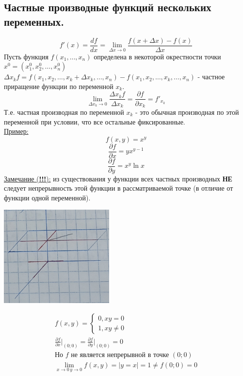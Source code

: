 \documentclass[12pt]{article}
\begin{document}
    \subsection{Частные производные функций нескольких переменных.}
    \[ f'(x) = \frac{df}{dx} = \lim_{\Delta x \to 0}\frac{f(x+\Delta x) - f(x)}{\Delta x} \]
    Пусть функция $f(x_1, \dots, x_n)$ определена в некоторой окрестности точки $x^0 = (x^0_1, x^0_2, \dots, x^0_n)$\\
    $\Delta x_k f = f(x_1, x_2, \dots, x_k + \Delta x_k, \dots, x_n) - f(x_1, x_2, \dots, x_k, \dots, x_n)$ - частное приращение функции по переменной $x_k$.
    \[ \lim_{\Delta x_k \to 0} \frac{\Delta x_k f}{\Delta x_k} = \frac{\partial f}{\partial x_k} = f'_{x_k} \]
    Т.е. частная производная по переменной $x_k$ - это обычная производная по этой переменной при условии, что все остальные фиксированные.\\
    \underline{Пример:}
    \[ f(x,y) = x^y \]
    \[ \frac{\partial f}{\partial x} = yx^{y-1} \]
    \[ \frac{\partial f}{\partial y} = x^y \ln x \]
    \underline{Замечание (\textbf{!!!}):} из существования у функции всех частных производных \textbf{НЕ} следует непрерывность этой функции в рассматриваемой точке (в отличие от функции одной переменной).
    \begin{center}
        \includegraphics{7.4.1.png}
    \end{center}
    \begin{gather*}
        f(x, y) = \begin{cases}
            0, xy = 0\\
            1, xy \ne 0
        \end{cases}\\
        \frac{\partial f}{\partial x} \Big|_{(0; 0)} = \frac{\partial f}{\partial y} \Big|_{(0; 0)} = 0\\
        \text{Но } f \text{ не является непрерывной в точке } (0; 0)\\
        \lim_{x\to 0\, y\to 0}f(x,y) = | y = x | = 1 \ne f(0;0) = 0
    \end{gather*}
\end{document}
